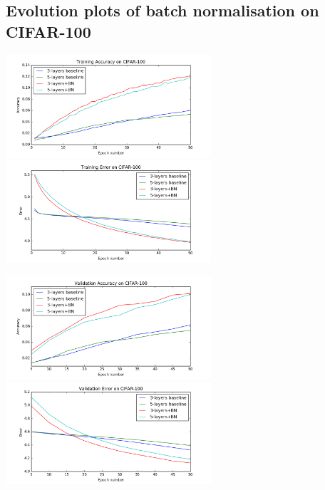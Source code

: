 \documentclass[]{article}
\begin{document}
\subsection{Evolution plots of batch normalisation on CIFAR-100}
\includegraphics[width=3in]{BN_train_acc_100}
\includegraphics[width=3in]{BN_train_err_100}

\includegraphics[width=3in]{BN_valid_acc_100}
\includegraphics[width=3in]{BN_valid_err_100}
\end{document}
